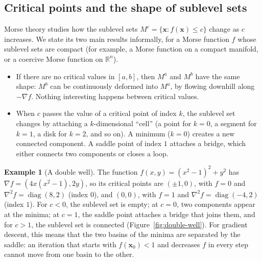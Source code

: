 \documentclass[11pt]{article}
\theoremstyle{definition}
\newtheorem{example}[definition]{Example}
\theoremstyle{plain}
\theoremstyle{remark}
\DeclareMathOperator{\diag}{diag}
\begin{document}
\subsection{Critical points and the shape of sublevel sets}

Morse theory studies how the sublevel sets $M^c = \{\mathbf{x} : f(\mathbf{x}) \leq c\}$ change as $c$ increases. We state its two main results informally, for a Morse function $f$ whose sublevel sets are compact (for example, a Morse function on a compact manifold, or a coercive Morse function on $\mathbb{R}^n$).
\begin{itemize}
    \item If there are no critical values in $[a, b]$, then $M^a$ and $M^b$ have the same shape: $M^b$ can be continuously deformed into $M^a$, by flowing downhill along $-\nabla f$. Nothing interesting happens between critical values.
    \item When $c$ passes the value of a critical point of index $k$, the sublevel set changes by attaching a $k$-dimensional ``cell'' (a point for $k = 0$, a segment for $k = 1$, a disk for $k = 2$, and so on). A minimum ($k = 0$) creates a new connected component. A saddle point of index $1$ attaches a bridge, which either connects two components or closes a loop.
\end{itemize}

\begin{example}[A double well]\label{ex:double-well}
    The function $f(x, y) = (x^2 - 1)^2 + y^2$ has $\nabla f = (4x(x^2 - 1), 2y)$, so its critical points are $(\pm 1, 0)$, with $f = 0$ and $\nabla^2 f = \diag(8, 2)$ (index $0$), and $(0, 0)$, with $f = 1$ and $\nabla^2 f = \diag(-4, 2)$ (index $1$). For $c < 0$, the sublevel set is empty; at $c = 0$, two components appear at the minima; at $c = 1$, the saddle point attaches a bridge that joins them, and for $c > 1$, the sublevel set is connected (Figure~\ref{fig:double-well}). For gradient descent, this means that the two basins of the minima are separated by the saddle: an iteration that starts with $f(\mathbf{x}_0) < 1$ and decreases $f$ in every step cannot move from one basin to the other.
\end{example}
\end{document}
